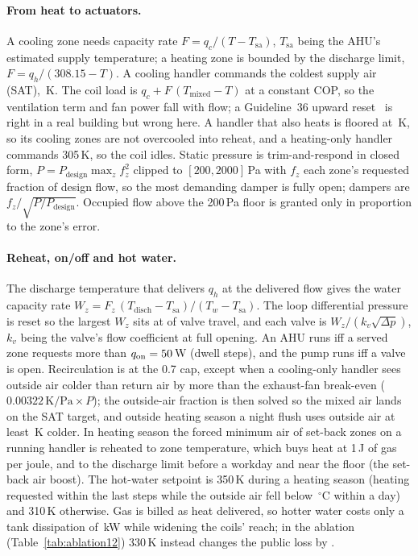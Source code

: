 \documentclass{article}
\begin{document}
\paragraph{From heat to actuators.} A cooling zone needs capacity rate $F = q_c/(T - T_{\text{sa}})$, $T_{\text{sa}}$ being the AHU's estimated supply temperature; a heating zone is bounded by the discharge limit, $F = q_h/(308.15 - T)$. A cooling handler commands the coldest supply air (SAT), \ParSatCoolHi\,K. The coil load is $q_c + F\,(T_{\text{mixed}} - T)$ at a constant COP, so the ventilation term and fan power fall with flow; a Guideline~36 upward reset~\citep{ashrae2021g36,taylor2018vav} is right in a real building but wrong here. A handler that also heats is floored at \ParSatMixFloor\,K, so its cooling zones are not overcooled into reheat, and a heating-only handler commands 305\,K, so the coil idles. Static pressure is trim-and-respond in closed form, $P = P_{\text{design}}\max_z f_z^2$ clipped to $[200, 2000]$\,Pa with $f_z$ each zone's requested fraction of design flow, so the most demanding damper is fully open; dampers are $f_z/\sqrt{P/P_{\text{design}}}$. Occupied flow above the 200\,Pa floor is granted only in proportion to the zone's error.

\paragraph{Reheat, on/off and hot water.} The discharge temperature that delivers $q_h$ at the delivered flow gives the water capacity rate $W_z = F_z\,(T_{\text{disch}} - T_{\text{sa}})/(T_w - T_{\text{sa}})$. The loop differential pressure is reset so the largest $W_z$ sits at \ParValveTarget{} of valve travel, and each valve is $W_z/(k_v \sqrt{\Delta p})$, $k_v$ being the valve's flow coefficient at full opening. An AHU runs iff a served zone requests more than $q_{\text{on}} = 50$\,W (dwell \ParMinOnSteps{} steps), and the pump runs iff a valve is open. Recirculation is at the 0.7 cap, except when a cooling-only handler sees outside air colder than return air by more than the exhaust-fan break-even ($0.00322\,\text{K/Pa}\times P$); the outside-air fraction is then solved so the mixed air lands on the SAT target, and outside heating season a night flush uses outside air at least \ParRFFlushDt\,K colder. In heating season the forced minimum air of set-back zones on a running handler is reheated to zone temperature, which buys heat at 1\,J of gas per joule, and to the discharge limit before a workday and near the floor (the set-back air boost). The hot-water setpoint is 350\,K during a heating season (heating requested within the last \RTenSeasonSteps{} steps while the outside air fell below \RTenSeasonOatC\,$^\circ$C within a day) and 310\,K otherwise. Gas is billed as heat delivered, so hotter water costs only a tank dissipation of \TankLossExtraKw\,kW while widening the coils' reach; in the ablation (Table~\ref{tab:ablation12}) 330\,K instead changes the public loss by \RElvAbTwRel.
\end{document}
